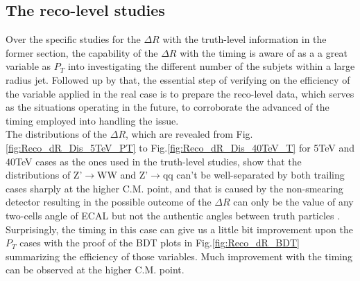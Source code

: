 

\subsection{The reco-level studies}
Over the specific studies for the $\Delta R$ with the truth-level information in the former section, the capability of the $\Delta R$ with the timing is aware of as a a great variable as $P_{T}$ into investigating the different number of the subjets within a large radius jet. Followed up by that, the essential step of verifying on the efficiency of the variable applied in the real case is to prepare the reco-level data, which serves as the situations operating in the future, to corroborate the advanced of the timing employed into handling the issue.\\ 

The distributions of the $\Delta R$, which are revealed from Fig.\ref{fig:Reco_dR_Dis_5TeV_PT} to Fig.\ref{fig:Reco_dR_Dis_40TeV_T} for 5TeV and 40TeV cases as the ones used in the truth-level studies, show that the distributions of Z'$\rightarrow$WW and Z'$\rightarrow$qq can't be well-separated by both trailing cases sharply at the higher C.M. point, and that is caused by the non-smearing detector resulting in the possible outcome of the $\Delta R$ can only be the value of any two-cells angle of ECAL but not the authentic angles between truth particles . Surprisingly, the timing in this case can give us a little bit improvement upon the $P_{T}$ cases with the proof of the BDT plots in Fig.\ref{fig:Reco_dR_BDT} summarizing the efficiency of those variables. Much improvement with the timing can be observed at the higher C.M. point.\\

